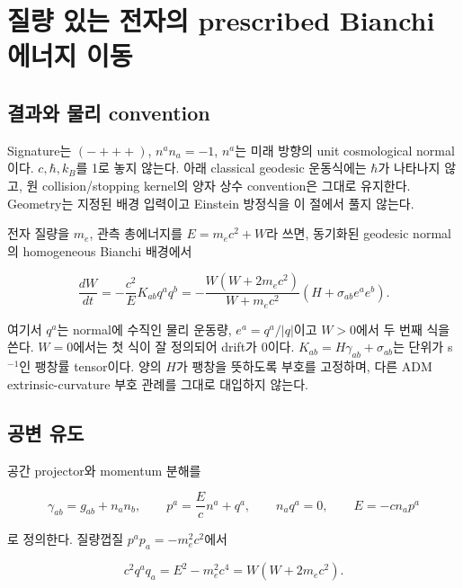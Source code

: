 \clearpage

\hypertarget{uxc9c8uxb7c9-uxc788uxb294-uxc804uxc790uxc758-prescribed-bianchi-uxc5d0uxb108uxc9c0-uxc774uxb3d9}{%
\section{질량 있는 전자의 prescribed Bianchi 에너지 이동}\label{uxc9c8uxb7c9-uxc788uxb294-uxc804uxc790uxc758-prescribed-bianchi-uxc5d0uxb108uxc9c0-uxc774uxb3d9}}

\hypertarget{uxacb0uxacfcuxc640-uxbb3cuxb9ac-convention}{%
\subsection{결과와 물리 convention}\label{uxacb0uxacfcuxc640-uxbb3cuxb9ac-convention}}

Signature는 \((-+++)\), \(n^an_a=-1\), \(n^a\)는 미래 방향의 unit cosmological normal이다. \(c,\hbar,k_B\)를 1로 놓지 않는다. 아래 classical geodesic 운동식에는 \(\hbar\)가 나타나지 않고, 원 collision/stopping kernel의 양자 상수 convention은 그대로 유지한다. Geometry는 지정된 배경 입력이고 Einstein 방정식을 이 절에서 풀지 않는다.

전자 질량을 \(m_e\), 관측 총에너지를 \(E=m_ec^2+W\)라 쓰면, 동기화된 geodesic normal의 homogeneous Bianchi 배경에서

\[\frac{dW}{dt}=-\frac{c^2}{E}K_{ab}q^aq^b
=-\frac{W(W+2m_ec^2)}{W+m_ec^2}\left(H+\sigma_{ab}e^ae^b\right).\tag{BG.1}\]

여기서 \(q^a\)는 normal에 수직인 물리 운동량, \(e^a=q^a/|q|\)이고 \(W>0\)에서 두 번째 식을 쓴다. \(W=0\)에서는 첫 식이 잘 정의되어 drift가 0이다. \(K_{ab}=H\gamma_{ab}+\sigma_{ab}\)는 단위가 s\(^{-1}\)인 팽창률 tensor이다. 양의 \(H\)가 팽창을 뜻하도록 부호를 고정하며, 다른 ADM extrinsic-curvature 부호 관례를 그대로 대입하지 않는다.

\hypertarget{uxacf5uxbcc0-uxc720uxb3c4}{%
\subsection{공변 유도}\label{uxacf5uxbcc0-uxc720uxb3c4}}

공간 projector와 momentum 분해를

\[\gamma_{ab}=g_{ab}+n_an_b,\qquad p^a=\frac Ec n^a+q^a,\qquad n_aq^a=0,\qquad E=-cn_ap^a\tag{BG.2}\]

로 정의한다. 질량껍질 \(p^ap_a=-m_e^2c^2\)에서

\[c^2q^aq_a=E^2-m_e^2c^4=W(W+2m_ec^2).\tag{BG.3}\]

